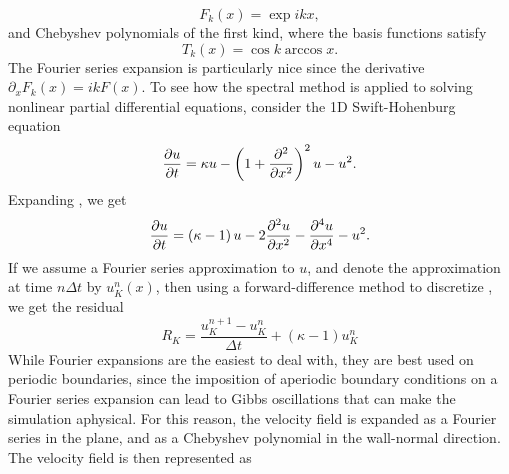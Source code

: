 \begin{equation}
F_k(x) = \exp{ikx},
\end{equation}
and Chebyshev polynomials of the first kind, where the basis functions satisfy
\begin{equation}
T_k(x) = \cos{k\arccos{x}}.
\end{equation}
The Fourier series expansion is particularly nice since the derivative $\partial_x F_k(x) = ikF(x)$. To see how the spectral method is applied to solving nonlinear partial differential equations, consider the 1D Swift-Hohenburg equation
\begin{equation}\label{eq:SHOG}
\pder{1}{u}{t} = \kappa u - \paren{1+\pder{2}{}{x}}^2u-u^2.
\end{equation}
Expanding , we get 
\begin{equation}\label{eq:SHEX}
\pder{1}{u}{t} = \paren{\kappa -1}u - 2\pder{2}{u}{x}-\pder{4}{u}{x} - u^2.
\end{equation}
If we assume a Fourier series approximation to $u$, and denote the approximation at time $n\Delta t$ by $u_K^n(x)$, then using a forward-difference method to discretize , we get the residual 
\begin{equation}
R_K = \frac{u_K^{n+1}-u_K^n}{\Delta t} + (\kappa-1)u_K^n 
\end{equation}
While Fourier expansions are the easiest to deal with, they are best used on periodic boundaries, since the imposition of aperiodic boundary conditions on a Fourier series expansion can lead to Gibbs oscillations that can make the simulation aphysical. For this reason, the velocity field is expanded as a Fourier series in the plane, and as a Chebyshev polynomial in the wall-normal direction. The velocity field is then represented as 